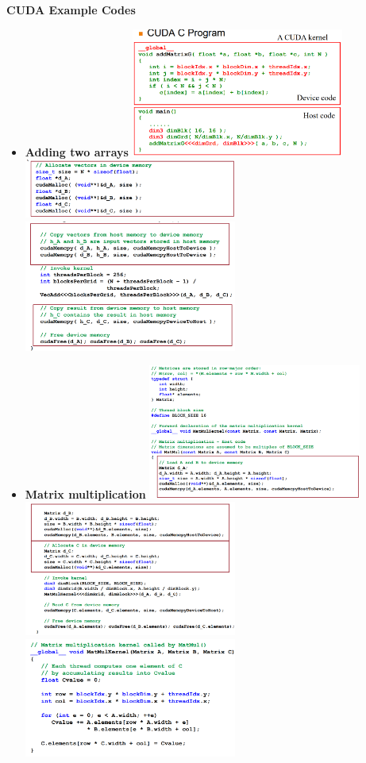 \documentclass[10pt, landscape]{article}
\begin{document}
\begin{multicols}{4}
\textbf{CUDA Example Codes}
\begin{itemize}
    \item \textbf{Adding two arrays}
    \includegraphics*[width=7cm]{cuda_basic.png}
    \includegraphics*[width=7cm]{cuda_basic_allocate.png}
    \includegraphics*[width=7cm]{cuda_basic_kernel.png}
    \item \textbf{Matrix multiplication}
    \includegraphics*[width=7cm]{cuda_matrix_mult_1.png}
    \includegraphics*[width=7cm]{cuda_matrix_mult_2.png}
    \includegraphics*[width=7cm]{cuda_matrix_mult_3.png}
\end{itemize}


\end{multicols}
\end{document}
